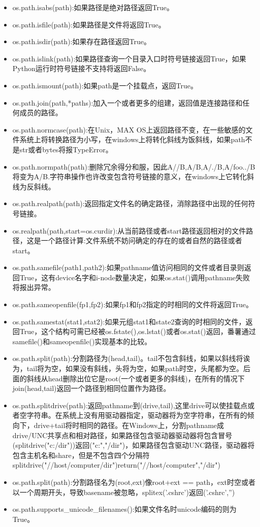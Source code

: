 \begin{itemize}
\item os.path.isabs(path):如果路径是绝对路径返回True。
\item os.path.isfile(path):如果路径是文件将返回True。
\item os.path.isdir(path):如果存在路径返回True。
\item os.path.islink(path):如果路径查询一个目录入口时符号链接返回True，如果Python运行时符号链接不支持将返回False。
\item os.path.ismount(path):如果path是一个挂载点，返回True。
\item os.path.join(path,*paths):加入一个或者更多的组建，返回值是连接路径和任何成员的路径。
\item os.path.normcase(path):在Unix，MAX OS上返回路径不变，在一些敏感的文件系统上将转换路径为小写，在windows上将转化斜线为饭斜线，如果path不是str或者bytes将报TypeError。
\item os.path.normpath(path):删除冗余得分和服，因此A//B,A/B,A/./B,A/foo../B将变为A/B.字符串操作也许改变包含符号链接的意义，在windows上它转化斜线为反斜线。
\item os.path.realpath(path):返回指定文件名的确定路径，消除路径中出现的任何符号链接。
\item os.realpath(path,start=os.curdir):从当前路径或者start路径返回相对的文件路径，这是一个路径计算:文件系统不妨问确定的存在的或者自然的路径或者start。
\item os.path.samefile(path1,path2):如果pathname值访问相同的文件或者目录则返回True，这有device名字和i-node数量决定，如果os.stat()调用pathname失败将报出异常。
\item os.path.sameopenfile(fp1,fp2):如果fp1和fp2指定的时相同的文件将返回True。
\item os.path.samestat(stat1,stat2):如果元组stat1和state2查询的时相同的文件，返回True，这个结构可需已经被os.fstate(),os.lstat()或者os.stat()返回，番薯通过samefile()和sameopenfile()实现基本的比较。
\item os.path.split(path):分割路径为(head,tail)。tail不包含斜线，如果以斜线将诶为，tail将为空，如果没有斜线，头将为空，如果path时空，头尾都为空。后面的斜线从head删除出位它是root(一个或者更多的斜线)，在所有的情况下join(head,tail)返回一个路径到相同位置作为路径。

\item os.path.splitdrive(path):返回pathname到(drive,tail),这里drive可以使挂载点或者空字符串。在系统上没有用驱动器指定，驱动器将为空字符串，在所有的倾向下，drive+tail将时相同的路径。在Windows上，分割pathname成drive/UNC共享点和相对路径，如果路径包含驱动器驱动器将包含冒号(splitdrive("c:/dir"))返回("c:","/dir")，如果路径包含驱动UNC路径，驱动器将包含主机名和share，但是不包含四个分隔符splitdrive("//host/computer/dir")return("//host/computer","/dir")
\item os.path.split(path):分割路径名为(root,ext)像root+ext == path，ext时空或者以一个周期开头，导致basename被忽略，splitex('.cshrc')返回('.cshrc','')
\item os.path.supports\_unicode\_filenames():如果文件名时unicode编码的则为True。
\end{itemize}
